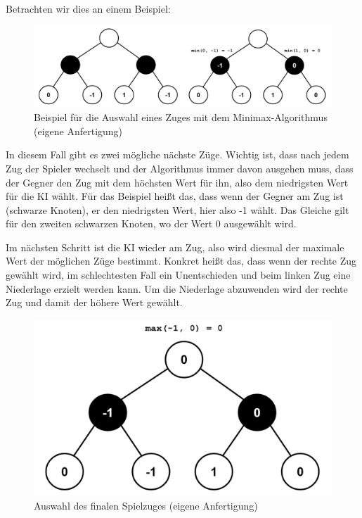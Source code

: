 Betrachten wir dies an einem Beispiel:
\begin{figure}[H]
    \centering
    \includegraphics[scale=0.4]{img/minimax_step_0.png}
    \caption[Beispiel für die Auswahl eines Zuges mit dem Minimax-Algorithmus]{Beispiel für die Auswahl eines Zuges mit dem Minimax-Algorithmus \\ (eigene Anfertigung)}
\end{figure}

In diesem Fall gibt es zwei mögliche nächste Züge. Wichtig ist, dass nach jedem Zug der Spieler wechselt und der Algorithmus 
immer davon ausgehen muss, dass der Gegner den Zug mit dem höchsten Wert für ihn, also dem niedrigsten Wert für die KI wählt. 
Für das Beispiel heißt das, dass wenn der Gegner am Zug ist (schwarze Knoten), er den niedrigsten Wert, hier also -1 wählt. 
Das Gleiche gilt für den zweiten schwarzen Knoten, wo der Wert 0 ausgewählt wird.

Im nächsten Schritt ist die KI wieder am Zug, also wird diesmal der maximale Wert der möglichen Züge bestimmt. Konkret heißt das, 
dass wenn der rechte Zug gewählt wird, im schlechtesten Fall ein Unentschieden und beim linken Zug eine Niederlage erzielt werden kann. 
Um die Niederlage abzuwenden wird der rechte Zug und damit der höhere Wert gewählt.\autocite[Vgl.][S. 2]{GlennStrong.2011}

\begin{figure}[H]
    \centering
    \includegraphics[scale=0.25]{img/minimax_step_1.png}
    \caption[Auswahl des finalen Spielzuges]{Auswahl des finalen Spielzuges (eigene Anfertigung)}
\end{figure}

